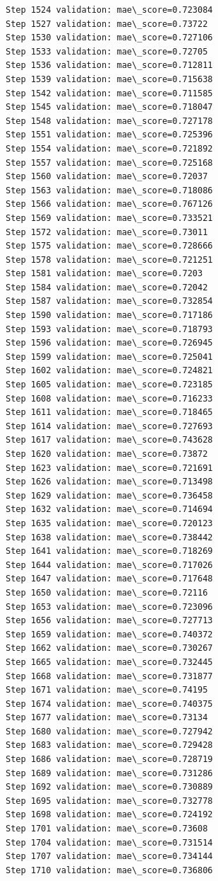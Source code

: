 \documentclass[11pt]{article}
\begin{document}
\begin{Verbatim}[commandchars=\\\{\}]
Step 1524 validation: mae\_score=0.723084
Step 1527 validation: mae\_score=0.73722
Step 1530 validation: mae\_score=0.727106
Step 1533 validation: mae\_score=0.72705
Step 1536 validation: mae\_score=0.712811
Step 1539 validation: mae\_score=0.715638
Step 1542 validation: mae\_score=0.711585
Step 1545 validation: mae\_score=0.718047
Step 1548 validation: mae\_score=0.727178
Step 1551 validation: mae\_score=0.725396
Step 1554 validation: mae\_score=0.721892
Step 1557 validation: mae\_score=0.725168
Step 1560 validation: mae\_score=0.72037
Step 1563 validation: mae\_score=0.718086
Step 1566 validation: mae\_score=0.767126
Step 1569 validation: mae\_score=0.733521
Step 1572 validation: mae\_score=0.73011
Step 1575 validation: mae\_score=0.728666
Step 1578 validation: mae\_score=0.721251
Step 1581 validation: mae\_score=0.7203
Step 1584 validation: mae\_score=0.72042
Step 1587 validation: mae\_score=0.732854
Step 1590 validation: mae\_score=0.717186
Step 1593 validation: mae\_score=0.718793
Step 1596 validation: mae\_score=0.726945
Step 1599 validation: mae\_score=0.725041
Step 1602 validation: mae\_score=0.724821
Step 1605 validation: mae\_score=0.723185
Step 1608 validation: mae\_score=0.716233
Step 1611 validation: mae\_score=0.718465
Step 1614 validation: mae\_score=0.727693
Step 1617 validation: mae\_score=0.743628
Step 1620 validation: mae\_score=0.73872
Step 1623 validation: mae\_score=0.721691
Step 1626 validation: mae\_score=0.713498
Step 1629 validation: mae\_score=0.736458
Step 1632 validation: mae\_score=0.714694
Step 1635 validation: mae\_score=0.720123
Step 1638 validation: mae\_score=0.738442
Step 1641 validation: mae\_score=0.718269
Step 1644 validation: mae\_score=0.717026
Step 1647 validation: mae\_score=0.717648
Step 1650 validation: mae\_score=0.72116
Step 1653 validation: mae\_score=0.723096
Step 1656 validation: mae\_score=0.727713
Step 1659 validation: mae\_score=0.740372
Step 1662 validation: mae\_score=0.730267
Step 1665 validation: mae\_score=0.732445
Step 1668 validation: mae\_score=0.731877
Step 1671 validation: mae\_score=0.74195
Step 1674 validation: mae\_score=0.740375
Step 1677 validation: mae\_score=0.73134
Step 1680 validation: mae\_score=0.727942
Step 1683 validation: mae\_score=0.729428
Step 1686 validation: mae\_score=0.728719
Step 1689 validation: mae\_score=0.731286
Step 1692 validation: mae\_score=0.730889
Step 1695 validation: mae\_score=0.732778
Step 1698 validation: mae\_score=0.724192
Step 1701 validation: mae\_score=0.73608
Step 1704 validation: mae\_score=0.731514
Step 1707 validation: mae\_score=0.734144
Step 1710 validation: mae\_score=0.736806

\end{Verbatim}
\end{document}
